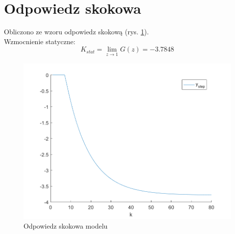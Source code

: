 \documentclass[a4paper, 10pt]{article}
\begin{document}
	\section{Odpowiedz skokowa}
	Obliczono ze wzoru odpowiedz skokową (rys. \ref{fig:z2}).\\
	Wzmocnienie statyczne:
	\[K_{stat}=\lim_{z\rightarrow 1}G(z)=-3.7848\]
	\begin{figure}[H]
		\centering
		\includegraphics[width=0.9\linewidth]{z2}
		\caption{Odpowiedz skokowa modelu}
		\label{fig:z2}
		\end{figure}
\end{document}
